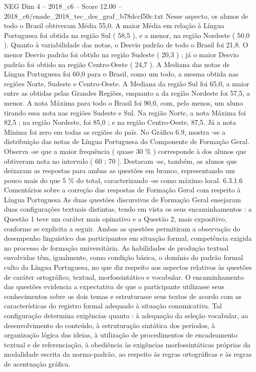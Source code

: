 \begin{textsample}{NEG Dim 4 – 2018\_c6 – Score 12.00 – 2018\_c6/enade\_2018\_tec\_des\_graf\_b78dccf50c.txt}
Nesse aspecto, os alunos de todo o Brasil obtiveram Média 55,0.
A maior Média em relação à Língua Portuguesa foi obtida na região Sul ( 58,5 ), e a menor, na região Nordeste ( 50,0 ).
Quanto à variabilidade das notas, o Desvio padrão de todo o Brasil foi 21,8.
O menor Desvio padrão foi obtido na região Sudeste ( 20,3 ) ; já o maior Desvio padrão foi obtido na região Centro-Oeste ( 24,7 ).
A Mediana das notas de Língua Portuguesa foi 60,0 para o Brasil, como um todo, a mesma obtida nas regiões Norte, Sudeste e Centro-Oeste.
A Mediana da região Sul foi 65,0, a maior entre as obtidas pelas Grandes Regiões, enquanto a da região Nordeste foi 57,5, a menor.
A nota Máxima para todo o Brasil foi 90,0, com, pelo menos, um aluno tirando essa nota nas regiões Sudeste e Sul.
Na região Norte, a nota Máxima foi 82,5 ; na região Nordeste, foi 85,0 ; e na região Centro-Oeste, 87,5.
Já a nota Mínima foi zero em todas as regiões do país.
No Gráfico 6.9, mostra -se a distribuição das notas de Língua Portuguesa do Componente de Formação Geral.
Observa -se que a maior frequência ( quase 30 \% ) corresponde à dos alunos que obtiveram nota no intervalo ( 60 ; 70 ].
Destacam -se, também, os alunos que deixaram as respostas para ambas as questões em branco, representando um pouco mais do que 5 \% do total, caracterizando -se como máximo local. 6.3.1.6 Comentários sobre a correção das respostas de Formação Geral com respeito à Língua Portuguesa As duas questões discursivas de Formação Geral ensejaram duas configurações textuais distintas, tendo em vista os seus encaminhamentos : a Questão 1 teve um caráter mais opinativo e a Questão 2, mais expositivo, conforme se explicita a seguir.
Ambas as questões permitiram a observação do desempenho linguístico dos participantes em situação formal, competência exigida no processo de formação universitária.
As habilidades de produção textual envolvidas têm, igualmente, como condição básica, o domínio do padrão formal culto da Língua Portuguesa, no que diz respeito aos aspectos relativos às questões de caráter ortográfico, textual, morfossintático e vocabular.
O encaminhamento das questões evidencia a expectativa de que o participante utilizasse seus conhecimentos sobre os dois temas e estruturasse seus textos de acordo com as características do registro formal adequado à situação comunicativa.
Tal configuração determina exigências quanto : à adequação da seleção vocabular, ao desenvolvimento do conteúdo, à estruturação sintática dos períodos, à organização lógica das ideias, à utilização de procedimentos de encadeamento textual e de referenciação, à obediência às exigências morfossintáticas próprias da modalidade escrita da norma-padrão, ao respeito às regras ortográficas e às regras de acentuação gráfica.

\end{textsample}
